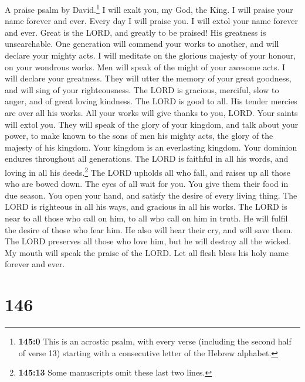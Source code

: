 A praise psalm by David.\footnote{\textbf{145:0} This is an acrostic
  psalm, with every verse (including the second half of verse 13)
  starting with a consecutive letter of the Hebrew alphabet.}
 I will exalt you, my God, the King. I will praise your
name forever and ever.  Every day I will praise you. I
will extol your name forever and ever.  Great is the LORD,
and greatly to be praised! His greatness is unsearchable. 
One generation will commend your works to another, and will declare your
mighty acts.  I will meditate on the glorious majesty of
your honour, on your wondrous works.  Men will speak of
the might of your awesome acts. I will declare your greatness.
 They will utter the memory of your great goodness, and
will sing of your righteousness.  The LORD is gracious,
merciful, slow to anger, and of great loving kindness. 
The LORD is good to all. His tender mercies are over all his works.
 All your works will give thanks to you, LORD. Your
saints will extol you.  They will speak of the glory of
your kingdom, and talk about your power,  to make known
to the sons of men his mighty acts, the glory of the majesty of his
kingdom.  Your kingdom is an everlasting kingdom. Your
dominion endures throughout all generations. The LORD is faithful in all
his words, and loving in all his deeds.\footnote{\textbf{145:13} Some
  manuscripts omit these last two lines.}  The LORD
upholds all who fall, and raises up all those who are bowed down.
 The eyes of all wait for you. You give them their food
in due season.  You open your hand, and satisfy the
desire of every living thing.  The LORD is righteous in
all his ways, and gracious in all his works.  The LORD is
near to all those who call on him, to all who call on him in truth.
 He will fulfil the desire of those who fear him. He also
will hear their cry, and will save them.  The LORD
preserves all those who love him, but he will destroy all the wicked.
 My mouth will speak the praise of the LORD. Let all
flesh bless his holy name forever and ever.

\hypertarget{section-138}{%
\section{146}\label{section-138}}

